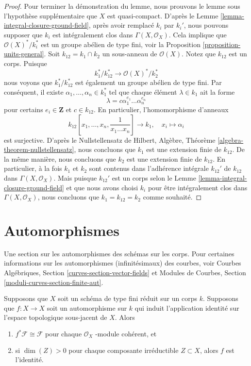 \begin{proof}
\medskip\noindent
Pour terminer la démonstration du lemme, nous prouvons
le lemme sous l’hypothèse supplémentaire que $X$ est
quasi-compact. D’après le Lemme
\ref{lemma-integral-closure-ground-field}, après avoir
remplacé $k_i$ par $k_i'$, nous pouvons supposer que $k_i$
est intégralement clos dans $\Gamma(X, \mathcal{O}_X)$.
Cela implique que $\mathcal{O}(X)^*/k_i^*$ est un groupe
abélien de type fini, voir la Proposition
\ref{proposition-units-general}. Soit $k_{12} = k_1 \cap k_2$ un
sous-anneau de $\mathcal{O}(X)$. Notez que $k_{12}$ est un corps. Puisque
$$
k_1^*/k_{12}^* \longrightarrow \mathcal{O}(X)^*/k_2^*
$$
nous voyons que $k_1^*/k_{12}^*$ est également un groupe abélien
de type fini. Par conséquent, il existe $\alpha_1, \ldots,
\alpha_n \in k_1^*$ tel que chaque élément $\lambda \in k_1$ ait la forme
$$
\lambda = c \alpha_1^{e_1} \ldots \alpha_n^{e_n}
$$
pour certains $e_i \in \mathbf{Z}$ et $c \in
k_{12}$. En particulier, l'homomorphisme d'anneaux
$$
k_{12}[x_1, \ldots, x_n, \frac{1}{x_1 \ldots x_n}] \longrightarrow k_1, \quad
x_i \longmapsto \alpha_i
$$
est surjective. D'après le Nullstellensatz de Hilbert, Algèbre,
Théorème \ref{algebra-theorem-nullstellensatz}, nous concluons
que $k_1$ est une extension finie de $k_{12}$. De la même
manière, nous concluons que $k_2$ est une extension finie de
$k_{12}$. En particulier, à la fois $k_1$ et $k_2$ sont contenus
dans l'adhérence intégrale $k_{12}'$ de $k_{12}$ dans $\Gamma(X,
\mathcal{O}_X)$. Mais puisque $k_{12}'$ est un corps selon le
Lemme \ref{lemma-integral-closure-ground-field} et que nous avons
choisi $k_i$ pour être intégralement clos dans $\Gamma(X,
\mathcal{O}_X)$, nous concluons que $k_1 = k_{12} = k_2$ comme souhaité.
\end{proof}





\section{Automorphismes}
\label{section-automorphisms}

\noindent
Une section sur les automorphismes des schémas sur les
corps. Pour certaines informations sur les automorphismes
(infinitésimaux) des courbes, voir Courbes Algébriques,
Section \ref{curves-section-vector-fields} et Modules de
Courbes, Section \ref{moduli-curves-section-finite-aut}.

\begin{lemma}
\label{lemma-automorphism}
Supposons que $X$ soit un schéma de type fini réduit sur un corps $k$.
Supposons que $f : X \to X$ soit un automorphisme sur $k$ qui induit
l’application identité sur l’espace topologique sous-jacent de $X$. Alors
\begin{enumerate}
\item $f^*\mathcal{F} \cong \mathcal{F}$ pour
chaque $\mathcal{O}_X$ -module cohérent, et
\item si $\dim(Z) > 0$ pour chaque composante
irréductible $Z \subset X$, alors $f$ est l'identité.
\end{enumerate}
\end{lemma}

